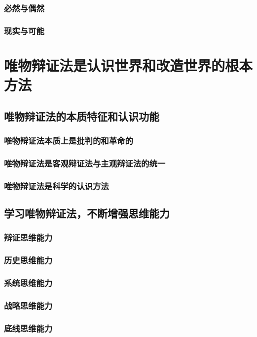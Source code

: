 \documentclass[10pt, UTF8]{book} %
\begin{document}
\subsubsection{必然与偶然}

\newpage
\subsubsection{现实与可能}

\section{唯物辩证法是认识世界和改造世界的根本方法}

\subsection{唯物辩证法的本质特征和认识功能}
\subsubsection{唯物辩证法本质上是批判的和革命的}
\subsubsection{唯物辩证法是客观辩证法与主观辩证法的统一}
\subsubsection{唯物辩证法是科学的认识方法}

\subsection{学习唯物辩证法，不断增强思维能力}
\subsubsection{辩证思维能力}
\subsubsection{历史思维能力}
\subsubsection{系统思维能力}
\subsubsection{战略思维能力}
\subsubsection{底线思维能力}
\end{document}
